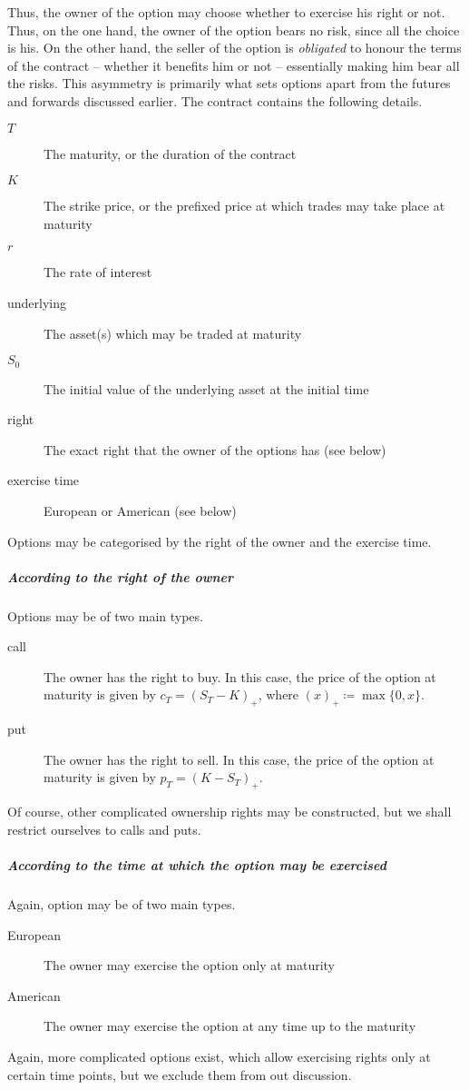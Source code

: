 Thus, the owner of the option may choose whether to exercise his right or not. Thus, on the one hand, the owner of the option bears no risk, since all the choice is his. On the other hand, the seller of the option is \emph{obligated} to honour the terms of the contract -- whether it benefits him or not -- essentially making him bear all the risks. This asymmetry is primarily what sets options apart from the futures and forwards discussed earlier.
The contract contains the following details.
\begin{description}
	\item[$ T $] The maturity, or the duration of the contract
	\item[$ K $] The strike price, or the prefixed price at which trades may take place at maturity
	\item[$ r $] The rate of interest
	\item[underlying] The asset(s) which may be traded at maturity
	\item[$ S_0 $] The initial value of the underlying asset at the initial time
	\item[right] The exact right that the owner of the options has (see below)
	\item[exercise time] European or American (see below)
\end{description}

Options may be categorised by the right of the owner and the exercise time.

\subparagraph{According to the right of the owner}  Options may be of two main types.
\begin{description}
	\item[call] The owner has the right to buy. In this case, the price of the option at maturity is given by $ c_T = (S_T - K)_+ $, where $ (x)_+ \coloneqq \max \{ 0, x \} $.
	\item[put] The owner has the right to sell. In this case, the price of the option at maturity is given by $ p_T = (K - S_T)_+ $.
\end{description}
Of course, other complicated ownership rights may be constructed, but we shall restrict ourselves to calls and puts.

\subparagraph{According to the time at which the option may be exercised}  Again, option may be of two main types.
\begin{description}
	\item[European] The owner may exercise the option only at maturity
	\item[American] The owner may exercise the option at any time up to the maturity
\end{description}
Again, more complicated options exist, which allow exercising rights only at certain time points, but we exclude them from out discussion.

